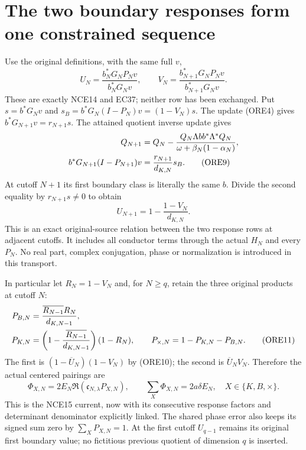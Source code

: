 \documentclass[11pt]{article}
\begin{document}
\section{The two boundary responses form one constrained sequence}
Use the original definitions, with the same full $v$,
\[
 U_N=\frac{b_N^*G_NP_Nv}{b_N^*G_Nv},\qquad
 V_N=\frac{b_{N+1}^*G_NP_Nv}{b_{N+1}^*G_Nv}.           \tag{ORE8}
\]
These are exactly NCE14 and EC37; neither row has been exchanged.
Put $s=b^*G_Nv$ and $s_B=b^*G_N(I-P_N)v=(1-V_N)s$.
The update (ORE4) gives $b^*G_{N+1}v=r_{N+1}s$.
The attained quotient inverse update gives
\begin{align}
 Q_{N+1}&=Q_N-
 \frac{Q_N\Lambda b b^*\Lambda^*Q_N}
 {\omega+\beta_N(1-\alpha_N)},\notag\\
 b^*G_{N+1}(I-P_{N+1})v
 &=\frac{r_{N+1}}{d_{K,N}}s_B.                       \tag{ORE9}
\end{align}
At cutoff $N+1$ its first boundary class is literally the same $b$.
Divide the second equality by $r_{N+1}s\ne0$ to obtain
\begin{equation}\tag{ORE10}
 \boxed{\displaystyle
 U_{N+1}=1-\frac{1-V_N}{d_{K,N}}.}
\end{equation}
This is an exact original-source relation between the two response
rows at adjacent cutoffs. It includes all conductor terms through
the actual $H_N$ and every $P_N$. No real part, complex conjugation,
phase or normalization is introduced in this transport.

In particular let $R_N=1-V_N$ and, for $N\ge q$, retain the three
original products at cutoff $N$:
\begin{align}
 P_{B,N}&=\frac{\overline{R_{N-1}}R_N}{d_{K,N-1}},\notag\\
 P_{K,N}&=\left(1-\frac{\overline{R_{N-1}}}{d_{K,N-1}}\right)(1-R_N),
 \qquad P_{\times,N}=1-P_{K,N}-P_{B,N}.                \tag{ORE11}
\end{align}
The first is $(1-\overline U_N)(1-V_N)$ by (ORE10); the second
is $\overline U_NV_N$. Therefore the actual centered pairings are
\begin{equation}\tag{ORE12}
 \Phi_{X,N}=2E_N\Re(\mathfrak c_{N,\lambda}P_{X,N}),\qquad
 \sum_X\Phi_{X,N}=2a\delta E_N,
 \quad X\in\{K,B,\times\}.
\end{equation}
This is the NCE15 current, now with its consecutive response factors
and determinant denominator explicitly linked. The shared phase error
also keeps its signed sum zero by $\sum_XP_{X,N}=1$.
At the first cutoff $U_{q-1}$ remains its original first boundary value;
no fictitious previous quotient of dimension $q$ is inserted.
\end{document}

